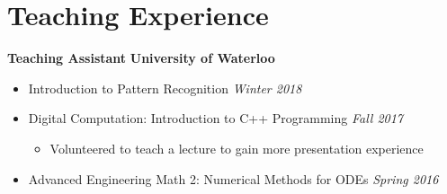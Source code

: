 \section*{Teaching Experience}
    \vspace{\postsubhead}
	\textbf{Teaching Assistant}
 	\hfill
    \textbf{University of Waterloo}
      \begin{itemize}
        \item Introduction to Pattern Recognition
          \hfill
      	 \textit{Winter 2018}
      \end{itemize}
	
      \begin{itemize}
        \item Digital Computation: Introduction to C++ Programming
          \hfill
      	 \textit{Fall 2017}
        \begin{itemize}
            \item Volunteered to teach a lecture to gain more presentation experience
        \end{itemize}

      \end{itemize}
      \begin{itemize}
        \item Advanced Engineering Math 2: Numerical Methods for ODEs
          \hfill
      	 \textit{Spring 2016}
      \end{itemize}
   \vspace{\interlist}
   
      
